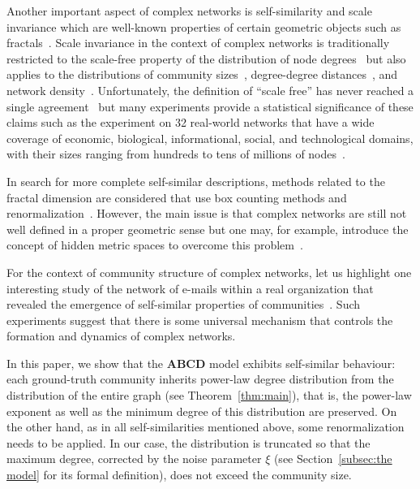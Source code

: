 \documentclass[12pt]{article}
\theoremstyle{definition}
\theoremstyle{remark}
\theoremstyle{remark}
\numberwithin{theorem}{section}
\begin{document}
\bigskip

Another important aspect of complex networks is self-similarity and scale invariance which are well-known properties of certain geometric objects such as fractals~\cite{mandelbrot1982fractal}. Scale invariance in the context of complex networks is traditionally restricted to the scale-free property of the distribution of node degrees~\cite{barabasi1999emergence} but also applies to the distributions of community sizes~\cite{guimera2003self,clauset2004finding}, degree-degree distances~\cite{zhou2020power}, and network density~\cite{blagus2012self}. Unfortunately, the definition of ``scale free'' has never reached a single agreement~\cite{broido2019scale,holme2019rare} but many experiments provide a statistical significance of these claims such as the experiment on 32 real-world networks that have a wide coverage of economic, biological, informational, social, and technological domains, with their sizes ranging from hundreds to tens of millions of nodes~\cite{zhou2020power}.

In search for more complete self-similar descriptions, methods related to the fractal dimension are considered that use box counting methods and renormalization~\cite{song2005self,gallos2007review,kim2007fractality}. However, the main issue is that complex networks are still not well defined in a proper geometric sense but one may, for example, introduce the concept of hidden metric spaces to overcome this problem~\cite{serrano2008self}. 

For the context of community structure of complex networks, let us highlight one interesting study of the network of e-mails within a real organization that revealed the emergence of self-similar properties of communities~\cite{guimera2003self}. Such experiments suggest that there is some universal mechanism that controls the formation and dynamics of complex networks. 

\bigskip

In this paper, we show that the \textbf{ABCD} model exhibits self-similar behaviour: each ground-truth community inherits power-law degree distribution from the distribution of the entire graph (see Theorem~\ref{thm:main}), that is, the power-law exponent as well as the minimum degree of this distribution are preserved. On the other hand, as in all self-similarities mentioned above, some renormalization needs to be applied. In our case, the distribution is truncated so that the maximum degree, corrected by the noise parameter $\xi$ (see Section~\ref{subsec:the model} for its formal definition), does not exceed the community size.
\end{document}
